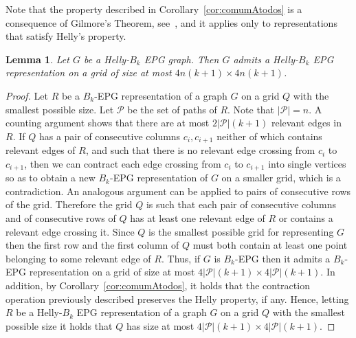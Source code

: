 \documentclass[
submission
]{dmtcs-episciences}
\newtheorem{theorem}{Theorem}
\newtheorem{lemma}[theorem]{Lemma}
\begin{document}
Note that the property described in Corollary~\ref{cor:comumAtodos} is a consequence of Gilmore's Theorem, see~\cite{bergeDuchet1975}, and it applies only to representations that satisfy Helly's property.

\medskip




\begin{lemma}\label{lem:gridPolinomial}
Let $G$ be a Helly-$B_k$ EPG graph. Then $G$ admits a Helly-$B_k$ EPG representation on a grid of size at most $4n(k+1) \times 4n(k+1)$.
\end{lemma}
\begin{proof}
Let $R$ be a $B_k$-EPG representation of a graph $G$ on a grid $Q$ with the smallest possible size.
Let $\mathcal{P}$ be the set of paths of $R$. Note that $|\mathcal{P}|=n$.
A counting argument shows that there are at most $2|\mathcal{P}|(k+1)$ relevant edges in $R$. 
 If $Q$ has a pair of consecutive columns $c_i,c_{i+1}$ neither of which contains relevant edges of $R$, and such that there is no relevant edge crossing from $c_i$ to $c_{i+1}$, then we can contract each edge crossing from $c_i$ to $c_{i+1}$ into single vertices so as to obtain a new  $B_k$-EPG representation of $G$ on a smaller grid, which is a contradiction. An analogous argument can be applied to pairs of consecutive rows of the grid.
 Therefore the grid $Q$ is such that each pair of consecutive columns and of consecutive rows of $Q$  has at least one relevant edge of $R$ or contains a relevant edge crossing it.  
  Since $Q$ is the smallest possible grid for representing $G$ then the first row and the first column of $Q$ must both contain at least one point belonging to some relevant edge of $R$. 
Thus, if $G$ is $B_k$-EPG then it admits a $B_k$-EPG representation on a grid of size at most $4|\mathcal{P}|(k+1) \times 4|\mathcal{P}|(k+1)$.
In addition, by Corollary~\ref{cor:comumAtodos}, it holds that the contraction operation previously described preserves the Helly property, if any. Hence, letting $R$ be a Helly-$B_k$ EPG representation of a graph $G$ on a grid $Q$ with the smallest possible size it holds that $Q$ has size at most $4|\mathcal{P}|(k+1) \times 4|\mathcal{P}|(k+1)$.
\end{proof}
\end{document}
